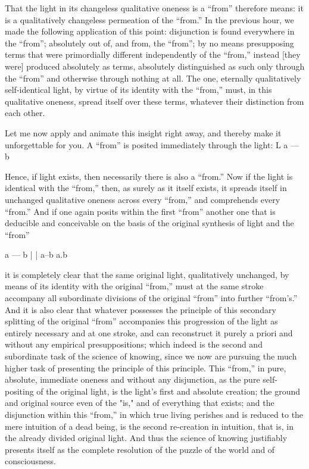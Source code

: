 That the light in its changeless qualitative oneness
is a “from” therefore means:
it is a qualitatively changeless
permeation of the “from.”
In the previous hour,
we made the following application of this point:
disjunction is found everywhere in the “from”;
absolutely out of, and from, the “from”;
by no means presupposing terms
that were primordially different
independently of the “from,”
instead [they were] produced absolutely as terms,
absolutely distinguished as such
only through the “from”
and otherwise through nothing at all.
The one, eternally qualitatively self-identical light,
by virtue of its identity with the “from,”
must, in this qualitative oneness,
spread itself over these terms,
whatever their distinction from each other.

Let me now apply and animate this insight right away,
and thereby make it unforgettable for you.
A “from” is posited immediately through the light:
L
a — b

Hence, if light exists,
then necessarily there is also a “from.”
Now if the light is identical with the “from,”
then, as surely as it itself exists,
it spreads itself in unchanged qualitative oneness
across every “from,” and comprehends every “from.”
And if one again posits within the first “from”
another one that is deducible and conceivable
on the basis of the original synthesis of
light and the “from”

a — b
|
|
a–b a.b

it is completely clear that
the same original light, qualitatively unchanged,
by means of its identity with the original “from,”
must at the same stroke accompany all subordinate divisions of
the original “from” into further “from's.”
And it is also clear that whatever possesses
the principle of this secondary splitting
of the original “from” accompanies
this progression of the light
as entirely necessary and at one stroke,
and can reconstruct it purely a priori
and without any empirical presuppositions;
which indeed is the second and subordinate task
of the science of knowing,
since we now are pursuing the much higher task
of presenting the principle of this principle.
This “from,” in pure, absolute, immediate oneness
and without any disjunction,
as the pure self-positing of the original light,
is the light's first and absolute creation;
the ground and original source even of the "is,"
and of everything that exists;
and the disjunction within this “from,”
in which true living perishes and is reduced to
the mere intuition of a dead being,
is the second re-creation in intuition,
that is, in the already divided original light.
And thus the science of knowing justifiably presents itself
as the complete resolution of the puzzle of the world
and of consciousness.


